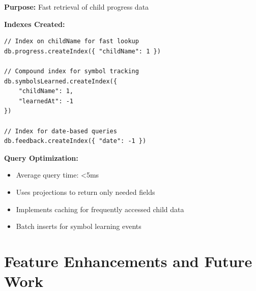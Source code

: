 \documentclass[12pt, a4paper]{article}
\begin{document}
\begin{tcolorbox}[colback=aliengreen!5, colframe=aliengreen, title=\textbf{MongoDB Indexing Strategy}]

\textbf{Purpose:} Fast retrieval of child progress data

\textbf{Indexes Created:}
\begin{verbatim}
// Index on childName for fast lookup
db.progress.createIndex({ "childName": 1 })

// Compound index for symbol tracking
db.symbolsLearned.createIndex({ 
    "childName": 1, 
    "learnedAt": -1 
})

// Index for date-based queries
db.feedback.createIndex({ "date": -1 })
\end{verbatim}

\textbf{Query Optimization:}
\begin{itemize}
    \item Average query time: <5ms
    \item Uses projections to return only needed fields
    \item Implements caching for frequently accessed child data
    \item Batch inserts for symbol learning events
\end{itemize}

\end{tcolorbox}

\section{Feature Enhancements and Future Work}
\end{document}
